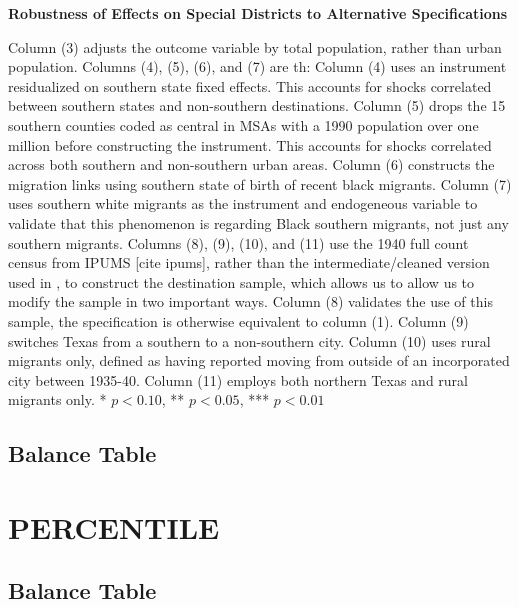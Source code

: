 \documentclass{article}
\begin{document}
\begin{landscape}
\begin{table}[ht]
\centering
\caption{\textbf{Robustness of Effects on Special Districts to Alternative Specifications}}
\begin{threeparttable}

\begin{tablenotes}\footnotesize
\item Column (3) adjusts the outcome variable by total population, rather than urban population. Columns (4), (5), (6), and (7) are th: Column (4) uses an instrument residualized on southern state fixed effects. This accounts for shocks correlated between southern states and non-southern destinations. Column (5) drops the 15 southern counties coded as central in MSAs with a 1990 population over one million before constructing the instrument. This accounts for shocks correlated across both southern and non-southern urban areas. Column (6) constructs the migration links using southern state of birth of recent black migrants. Column (7) uses southern white migrants as the instrument and endogeneous variable to validate that this phenomenon is regarding Black southern migrants, not just any southern migrants. Columns (8), (9), (10), and (11) use the 1940 full count census from IPUMS [cite ipums], rather than the intermediate/cleaned version used in , to construct the destination sample, which allows us to allow us to modify the sample in two important ways. Column (8) validates the use of this sample, the specification is otherwise equivalent to column (1). Column (9) switches Texas from a southern to a non-southern city. Column (10) uses rural migrants only, defined as having reported moving from outside of an incorporated city between 1935-40. Column (11) employs both northern Texas and rural migrants only.  * \(p<0.10\), ** \(p<0.05\), *** \(p<0.01\)
\end{tablenotes}
\end{threeparttable}
\label{tab:spdist_insts}
\end{table}
\end{landscape}
\subsection{Balance Table}

\clearpage
\section{PERCENTILE}
\subsection{Balance Table}

\clearpage
\end{document}
